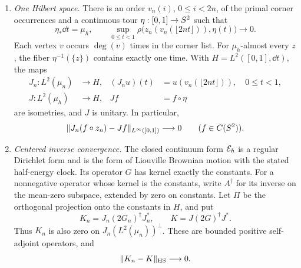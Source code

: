 \begin{proposition}
\begin{enumerate}[label=\textup{(\roman*)}]
\item \emph{One Hilbert space.}  There is an order
\(v_n(i)\), \(0\le i<2n\), of the primal corner occurrences and a
continuous tour \(\eta:[0,1]\to S^2\) such that
\begin{equation}\label{eq:tour-tracking}
 \eta_*\dd t=\mu_h,\qquad
 \sup_{0\le t<1}
 \rho\bigl(z_n(v_n(\lfloor2nt\rfloor)),\eta(t)\bigr)
 \longrightarrow0.
\end{equation}
Each vertex \(v\) occurs \(\deg(v)\) times in the corner list.  For
\(\mu_h\)-almost every \(z\), the fiber \(\eta^{-1}(\{z\})\)
contains exactly one time.  With \(H=L^2([0,1],\dd t)\), the maps
\begin{align*}
 J_n:L^2(\mu_n)&\longrightarrow H,&
 (J_nu)(t)&=u(v_n(\lfloor2nt\rfloor)),\quad 0\le t<1,\\
 J:L^2(\mu_h)&\longrightarrow H,& Jf&=f\circ\eta
\end{align*}
are isometries, and \(J\) is unitary.  In particular,
\begin{equation}\label{eq:continuous-pullbacks}
 \lVert J_n(f\circ z_n)-Jf\rVert_{L^\infty([0,1])}\longrightarrow0
 \qquad(f\in C(S^2)).
\end{equation}

\item \emph{Centered inverse convergence.}  The closed continuum form
\(\mathcal E_h\) is a regular Dirichlet form and is the form of Liouville
Brownian motion with the stated half-energy clock.  Its operator \(G\)
has kernel exactly the constants.  For a nonnegative operator whose
kernel is the constants, write \(A^\dagger\) for its inverse on the
mean-zero subspace, extended by zero on constants.  Let \(\Pi\) be the
orthogonal projection onto the constants in \(H\), and put
\begin{equation}\label{eq:centered-inverses}
 K_n=J_n(2G_n)^\dagger J_n^*,\qquad
 K=J(2G)^\dagger J^*.
\end{equation}
Thus \(K_n\) is also zero on \(J_n(L^2(\mu_n))^\perp\).  These are
bounded positive self-adjoint operators, and
\begin{equation}\label{eq:inverse-convergence}
 \lVert K_n-K\rVert_{\mathrm{HS}}\longrightarrow0.
\end{equation}


\end{enumerate}
\end{proposition}

